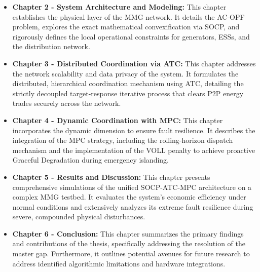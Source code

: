 \begin{itemize}
    \item \textbf{Chapter 2 - System Architecture and Modeling:} This chapter establishes the physical layer of the MMG network. It details the AC-OPF problem, explores the exact mathematical convexification via SOCP, and rigorously defines the local operational constraints for generators, ESSs, and the distribution network.
    \item \textbf{Chapter 3 - Distributed Coordination via ATC:} This chapter addresses the network scalability and data privacy of the system. It formulates the distributed, hierarchical coordination mechanism using ATC, detailing the strictly decoupled target-response iterative process that clears P2P energy trades securely across the network.
    \item \textbf{Chapter 4 - Dynamic Coordination with MPC:} This chapter incorporates the dynamic dimension to ensure fault resilience. It describes the integration of the MPC strategy, including the rolling-horizon dispatch mechanism and the implementation of the VOLL penalty to achieve proactive Graceful Degradation during emergency islanding.
    \item \textbf{Chapter 5 - Results and Discussion:} This chapter presents comprehensive simulations of the unified SOCP-ATC-MPC architecture on a complex MMG testbed. It evaluates the system's economic efficiency under normal conditions and extensively analyzes its extreme fault resilience during severe, compounded physical disturbances.
    \item \textbf{Chapter 6 - Conclusion:} This chapter summarizes the primary findings and contributions of the thesis, specifically addressing the resolution of the master gap. Furthermore, it outlines potential avenues for future research to address identified algorithmic limitations and hardware integrations.
\end{itemize}
